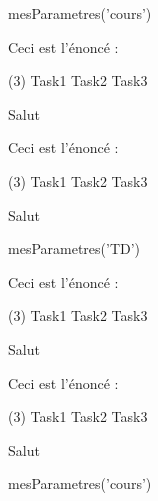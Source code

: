 \documentclass{classe-tex3R}
\begin{document}
\begin{luacode}
mesParametres('cours')
\end{luacode}
\parametrage


\begin{enonce}
  Ceci est l'énoncé :

  \begin{tasks}[style=itemize](3)
    \task Task1
    \task Task2
    \task Task3
  \end{tasks}
\end{enonce}

\textcolor{rouge}{Salut}

\newpage

\begin{enonce}
  Ceci est l'énoncé :

  \begin{tasks}[style=itemize](3)
    \task Task1
    \task Task2
    \task Task3
  \end{tasks}
\end{enonce}

\textcolor{rouge}{Salut}


\begin{luacode}
mesParametres('TD')
\end{luacode}
\parametrage

\begin{enonce}
  Ceci est l'énoncé :

  \begin{tasks}[style=itemize](3)
    \task Task1
    \task Task2
    \task Task3
  \end{tasks}
\end{enonce}

\textcolor{rouge}{Salut}

\newpage

\begin{enonce}
  Ceci est l'énoncé :

  \begin{tasks}[style=itemize](3)
    \task Task1
    \task Task2
    \task Task3
  \end{tasks}
\end{enonce}

\textcolor{rouge}{Salut}

\begin{luacode}
mesParametres('cours')
\end{luacode}
\parametrage
\end{document}
